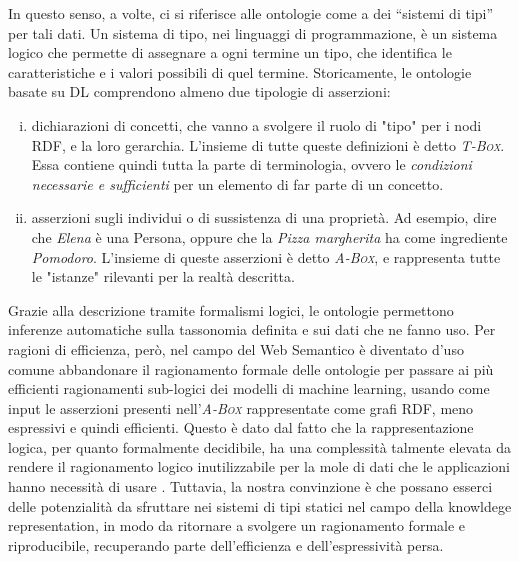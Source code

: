 In questo senso, a volte, ci si riferisce alle ontologie come a dei “sistemi di tipi” per tali dati. Un sistema di tipo, nei linguaggi di programmazione, 
è un sistema logico che permette di assegnare a ogni termine un tipo, che identifica le caratteristiche e i valori possibili di quel termine. Storicamente, 
le ontologie basate su DL comprendono almeno due tipologie di asserzioni:
\begin{enumerate}[i)]
	\item dichiarazioni di concetti, che vanno a svolgere il ruolo di "tipo" per i nodi RDF, e la loro gerarchia. L'insieme di tutte queste definizioni 
    è detto \textsc{\itshape T-Box}. Essa contiene quindi tutta la parte di terminologia, ovvero le \textit{condizioni necessarie e sufficienti} per un 
    elemento di far parte di un concetto.
	\item asserzioni sugli individui o di sussistenza di una proprietà. Ad esempio, dire che \textsl{Elena} è una Persona, oppure che la 
    \textsl{ Pizza margherita} ha come ingrediente \textsl{Pomodoro}. L'insieme di queste asserzioni è detto \textsc{\itshape A-Box}, e rappresenta 
    tutte le "istanze" rilevanti per la realtà descritta.
\end{enumerate}
Grazie alla descrizione tramite formalismi logici, le ontologie permettono inferenze automatiche sulla tassonomia definita e sui dati che ne fanno uso. 
Per ragioni di efficienza, però, nel campo del Web Semantico è diventato d'uso comune abbandonare il ragionamento formale delle ontologie per passare ai 
più efficienti ragionamenti sub-logici dei modelli di machine learning, usando come input le asserzioni presenti nell'\textsc{\itshape A-Box} rappresentate 
come grafi RDF, meno espressivi e quindi efficienti. Questo è dato dal fatto che la rappresentazione logica, per quanto formalmente decidibile, ha una 
complessità talmente elevata da rendere il ragionamento logico inutilizzabile per la mole di dati che le applicazioni hanno necessità di usare 
\cite{baader2017introductionDL}. Tuttavia, la nostra convinzione è che possano esserci delle potenzialità da sfruttare nei sistemi di tipi statici nel 
campo della knowldege representation, in modo da ritornare a svolgere un ragionamento formale e riproducibile, recuperando parte dell'efficienza e 
dell'espressività persa.
